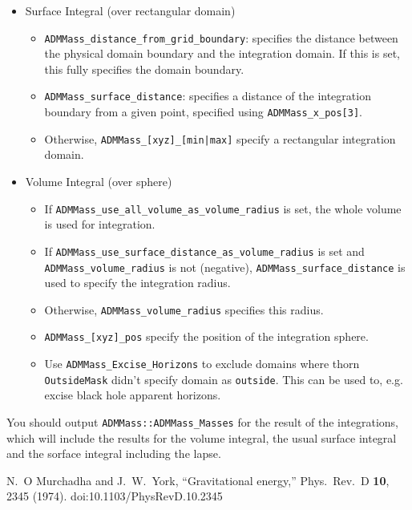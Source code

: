 \begin{itemize}
 \item Surface Integral (over rectangular domain)
  \begin{itemize}
   \item \texttt{ADMMass\_distance\_from\_grid\_boundary}: specifies the distance
         between the physical domain boundary and the integration domain. If
         this is set, this fully specifies the domain boundary.
   \item \texttt{ADMMass\_surface\_distance}: specifies a distance of the integration
         boundary from a given point, specified using \texttt{ADMMass\_x\_pos[3]}.
   \item Otherwise, \texttt{ADMMass\_[xyz]\_[min|max]} specify a rectangular
         integration domain.
  \end{itemize}
 \item Volume Integral (over sphere)
  \begin{itemize}
   \item If \texttt{ADMMass\_use\_all\_volume\_as\_volume\_radius} is set,
         the whole volume is used for integration.
   \item If \texttt{ADMMass\_use\_surface\_distance\_as\_volume\_radius} is set
         and \texttt{ADMMass\_volume\_radius} is not (negative),
         \texttt{ADMMass\_surface\_distance} is used to specify the integration
         radius.
   \item Otherwise, \texttt{ADMMass\_volume\_radius} specifies this radius.
   \item \texttt{ADMMass\_[xyz]\_pos} specify the position of the integration
         sphere.
   \item Use \texttt{ADMMass\_Excise\_Horizons} to exclude domains where
         thorn \texttt{OutsideMask} didn't specify domain as \texttt{outside}.
         This can be used to, e.g. excise black hole apparent horizons.
  \end{itemize}
\end{itemize}

You should output \texttt{ADMMass::ADMMass\_Masses} for the result of the
integrations, which will include the results for the volume integral, the
usual surface integral and the sorface integral including the lapse.

\begin{thebibliography}{1}
N.~O Murchadha and J.~W.~York,
  ``Gravitational energy,''
  Phys.\ Rev.\ D {\bf 10}, 2345 (1974).
  doi:10.1103/PhysRevD.10.2345
\end{thebibliography}




